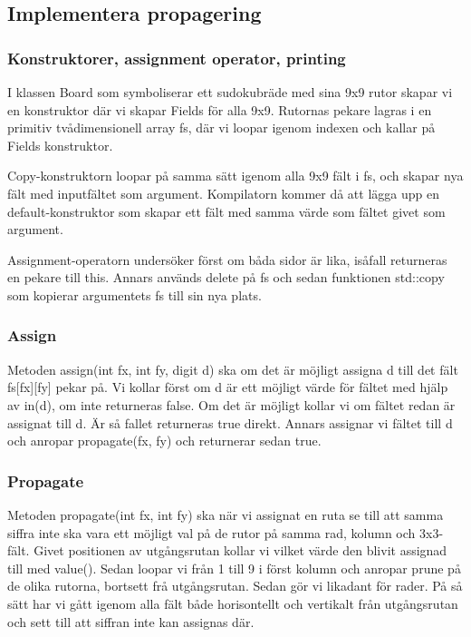 \documentclass[a4paper, 11pt]{article}
\begin{document}
\subsection{Implementera propagering}
\subsubsection{Konstruktorer, assignment operator, printing}

I klassen Board som symboliserar ett sudokubräde med sina 9x9 rutor skapar vi en konstruktor där vi skapar Fields för alla 9x9. Rutornas pekare lagras i en primitiv tvådimensionell array fs, där vi loopar igenom indexen och kallar på Fields konstruktor. 

Copy-konstruktorn loopar på samma sätt igenom alla 9x9 fält i fs, och skapar nya fält med inputfältet som argument. Kompilatorn kommer då att lägga upp en default-konstruktor som skapar ett fält med samma värde som fältet givet som argument. 

Assignment-operatorn undersöker först om båda sidor är lika, isåfall returneras en pekare till this. Annars används delete på fs och sedan funktionen std::copy som kopierar argumentets fs till sin nya plats.

\subsubsection{Assign}

Metoden assign(int fx, int fy, digit d) ska om det är möjligt assigna d till det fält fs[fx][fy] pekar på. Vi kollar först om d är ett möjligt värde för fältet med hjälp av in(d), om inte returneras false. Om det är möjligt kollar vi om fältet redan är assignat till d. Är så fallet returneras true direkt. Annars assignar vi fältet till d och anropar propagate(fx, fy) och returnerar sedan true. 

\subsubsection{Propagate}

Metoden propagate(int fx, int fy) ska när vi assignat en ruta se till att samma siffra inte ska vara ett möjligt val på de rutor på samma rad, kolumn och 3x3-fält. Givet positionen av utgångsrutan kollar vi vilket värde den blivit assignad till med value(). Sedan loopar vi från 1 till 9 i först kolumn och anropar prune på de olika rutorna, bortsett frå utgångsrutan. Sedan gör vi likadant för rader. På så sätt har vi gått igenom alla fält både horisontellt och vertikalt från utgångsrutan och sett till att siffran inte kan assignas där.
\end{document}
